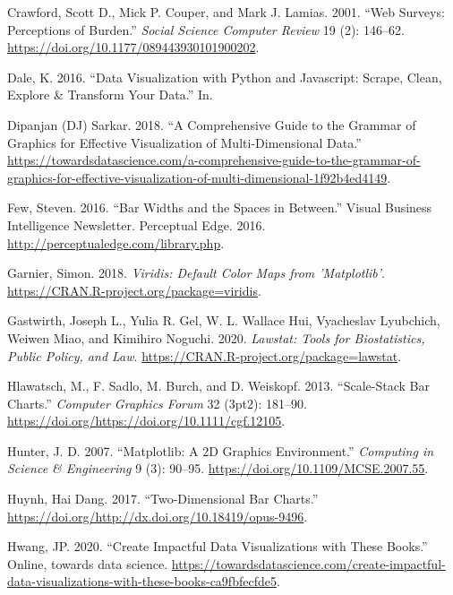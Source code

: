 \documentclass[
  11pt,
]{book}
\begin{document}
\leavevmode\hypertarget{ref-burdenpercep}{}%
Crawford, Scott D., Mick P. Couper, and Mark J. Lamias. 2001. ``Web
Surveys: Perceptions of Burden.'' \emph{Social Science Computer Review}
19 (2): 146--62. \url{https://doi.org/10.1177/089443930101900202}.

\leavevmode\hypertarget{ref-javapy}{}%
Dale, K. 2016. ``Data Visualization with Python and Javascript: Scrape,
Clean, Explore \& Transform Your Data.'' In.

\leavevmode\hypertarget{ref-grammar}{}%
Dipanjan (DJ) Sarkar. 2018. ``A Comprehensive Guide to the Grammar of
Graphics for Effective Visualization of Multi-Dimensional Data.''
\url{https://towardsdatascience.com/a-comprehensive-guide-to-the-grammar-of-graphics-for-effective-visualization-of-multi-dimensional-1f92b4ed4149}.

\leavevmode\hypertarget{ref-Few2016}{}%
Few, Steven. 2016. ``Bar Widths and the Spaces in Between.'' Visual
Business Intelligence Newsletter. Perceptual Edge. 2016.
\url{http://perceptualedge.com/library.php}.

\leavevmode\hypertarget{ref-viridis}{}%
Garnier, Simon. 2018. \emph{Viridis: Default Color Maps from
'Matplotlib'}. \url{https://CRAN.R-project.org/package=viridis}.

\leavevmode\hypertarget{ref-lawstat}{}%
Gastwirth, Joseph L., Yulia R. Gel, W. L. Wallace Hui, Vyacheslav
Lyubchich, Weiwen Miao, and Kimihiro Noguchi. 2020. \emph{Lawstat: Tools
for Biostatistics, Public Policy, and Law}.
\url{https://CRAN.R-project.org/package=lawstat}.

\leavevmode\hypertarget{ref-stackscale}{}%
Hlawatsch, M., F. Sadlo, M. Burch, and D. Weiskopf. 2013. ``Scale-Stack
Bar Charts.'' \emph{Computer Graphics Forum} 32 (3pt2): 181--90.
\url{https://doi.org/https://doi.org/10.1111/cgf.12105}.

\leavevmode\hypertarget{ref-matplot}{}%
Hunter, J. D. 2007. ``Matplotlib: A 2D Graphics Environment.''
\emph{Computing in Science \& Engineering} 9 (3): 90--95.
\url{https://doi.org/10.1109/MCSE.2007.55}.

\leavevmode\hypertarget{ref-HuynhHaiDang2017}{}%
Huynh, Hai Dang. 2017. ``Two-Dimensional Bar Charts.''
\url{https://doi.org/http://dx.doi.org/10.18419/opus-9496}.

\leavevmode\hypertarget{ref-hwang2020}{}%
Hwang, JP. 2020. ``Create Impactful Data Visualizations with These
Books.'' Online, towards data science.
\url{https://towardsdatascience.com/create-impactful-data-visualizations-with-these-books-ca9fbfecfde5}.
\end{document}
